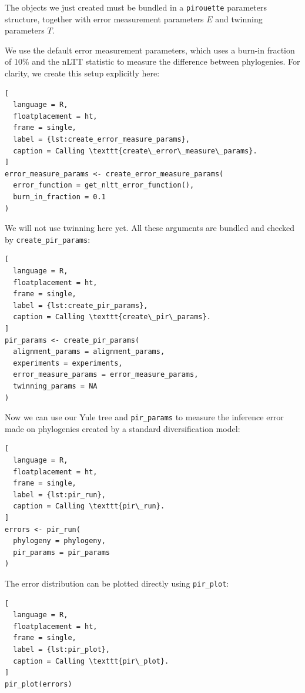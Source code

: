 The objects we just created must be bundled
in a \verb;pirouette; parameters structure,
together with error measurement parameters $\mathit{E}$ and
twinning parameters $\mathit{T}$. 

We use the default error measurement
parameters, which uses a burn-in fraction of 10\% and the nLTT statistic to
measure the difference between phylogenies. For clarity,
we create this setup explicitly here:

\begin{lstlisting}[
  language = R,
  floatplacement = ht,
  frame = single,
  label = {lst:create_error_measure_params},
  caption = Calling \texttt{create\_error\_measure\_params}.
]
error_measure_params <- create_error_measure_params(
  error_function = get_nltt_error_function(),
  burn_in_fraction = 0.1
)
\end{lstlisting}

We will not use twinning here yet.  
All these arguments are bundled
and checked by \verb;create_pir_params;:

\begin{lstlisting}[
  language = R,
  floatplacement = ht,
  frame = single,
  label = {lst:create_pir_params},
  caption = Calling \texttt{create\_pir\_params}.
]
pir_params <- create_pir_params(
  alignment_params = alignment_params,
  experiments = experiments,
  error_measure_params = error_measure_params,
  twinning_params = NA
)
\end{lstlisting}

Now we can use our Yule tree and \verb;pir_params; to measure 
the inference error made on phylogenies
created by a standard diversification model:

\begin{lstlisting}[
  language = R,
  floatplacement = ht,
  frame = single,
  label = {lst:pir_run},
  caption = Calling \texttt{pir\_run}.
]
errors <- pir_run(
  phylogeny = phylogeny,
  pir_params = pir_params
)
\end{lstlisting}

The error distribution can be plotted directly using \verb;pir_plot;:

\begin{lstlisting}[
  language = R,
  floatplacement = ht,
  frame = single,
  label = {lst:pir_plot},
  caption = Calling \texttt{pir\_plot}.
]
pir_plot(errors)
\end{lstlisting}

